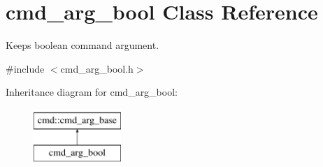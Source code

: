 \hypertarget{classcmd__arg__bool}{\section{cmd\-\_\-arg\-\_\-bool Class Reference}
\label{classcmd__arg__bool}
}


Keeps boolean command argument.  




{\ttfamily \#include $<$cmd\-\_\-arg\-\_\-bool.\-h$>$}

Inheritance diagram for cmd\-\_\-arg\-\_\-bool\-:\begin{figure}[H]
\begin{center}
\leavevmode
\includegraphics[height=2.000000cm]{classcmd__arg__bool}
\end{center}
\end{figure}
